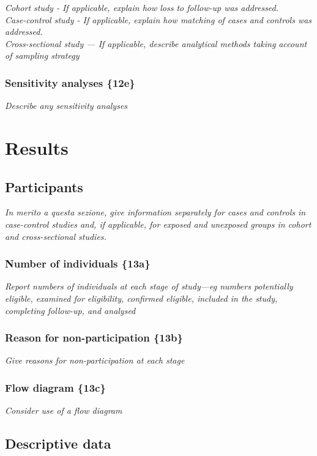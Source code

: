 {\em Cohort study - If applicable, explain how loss to follow-up was
addressed.\\
Case-control study - If applicable, explain how matching of cases and
controls was addressed.\\
Cross-sectional study — If applicable, describe analytical methods
taking account of sampling strategy
}

\subsubsection{Sensitivity analyses \{12e\}}

{\em Describe any sensitivity analyses}

\section{Results}

\subsection{Participants}

{\em In merito a questa sezione, give information separately for cases and
controls in case-control studies and, if applicable, for exposed and
unexposed groups in cohort and cross-sectional studies.}

\subsubsection{Number of individuals \{13a\}}

{\em Report numbers of individuals at each stage of study—eg numbers
potentially eligible, examined for eligibility, confirmed eligible,
included in the study, completing follow-up, and analysed}

\subsubsection{Reason for non-participation \{13b\}}

{\em Give reasons for non-participation at each stage}

\subsubsection{Flow diagram \{13c\}}

{\em Consider use of a flow diagram}

\subsection{Descriptive data}

